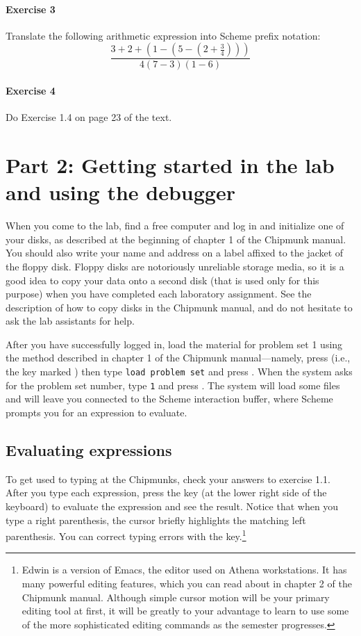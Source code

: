 \paragraph{Exercise 3}
Translate the following arithmetic expression into Scheme prefix notation:
\begin{displaymath}
\frac{3+2+(1-(5-(2+\frac{3}{4})))}{4 (7-3) (1-6)}
\end{displaymath}

\paragraph{Exercise 4}
Do Exercise 1.4 on page 23 of the text.


\section{Part 2: Getting started in the lab and using the debugger}

When you come to the lab, find a free computer and log in and initialize one of
your disks, as described at the beginning of chapter 1 of the Chipmunk manual.
You should also write your name and address on a label affixed to the jacket of
the floppy disk.  Floppy disks are notoriously unreliable storage media, so it
is a good idea to copy your data onto a second disk (that is used only for this
purpose) when you have completed each laboratory assignment.  See the
description of how to copy disks in the Chipmunk manual, and do not hesitate to
ask the lab assistants for help.

After you have successfully logged in, load the material for problem set 1
using the method described in chapter 1 of the Chipmunk manual---namely, press
 (i.e., the key marked ) then type {\tt load problem set}
and press .  When the system asks for the problem set number, type
{\tt 1} and press .  The system will load some files and will leave
you connected to the Scheme interaction buffer, where Scheme prompts you for an
expression to evaluate.

\subsection{Evaluating expressions} 

To get used to typing at the Chipmunks, check your answers to exercise
1.1.  After you type each expression, press the  key (at
the lower right side of the keyboard) to evaluate the expression and
see the result.  Notice that when you type a right parenthesis, the
cursor briefly highlights the matching left parenthesis.  You can
correct typing errors with the  key.\footnote{Edwin is
a version of Emacs, the editor used on Athena workstations.  It has
many powerful editing features, which you can read about in chapter 2
of the Chipmunk manual.  Although simple cursor motion will be your
primary editing tool at first, it will be greatly to your advantage to
learn to use some of the more sophisticated editing commands as the
semester progresses.}


